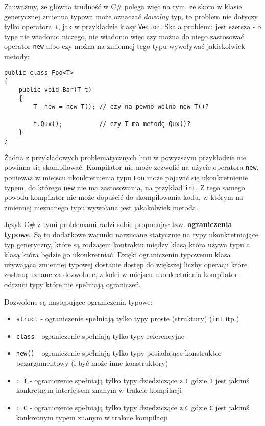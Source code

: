 Zauważmy, że główna trudność w C\# polega więc na tym, że skoro w klasie generycznej zmienna typowa może oznaczać
{\em dowolny} typ, to problem nie dotyczy tylko operatora {\tt +}, jak w przykładzie klasy {\tt Vector}. Skala problemu
jest szersza - o type nie wiadomo niczego, nie wiadomo więc czy można do niego zastosować operator {\tt new} albo czy można
na zmiennej tego typu wywoływać jakiekolwiek metody:

\begin{scriptsize}
\begin{verbatim}
public class Foo<T>
{
    public void Bar(T t)
    {
        T _new = new T(); // czy na pewno wolno new T()?

        t.Qux();          // czy T ma metodę Qux()?
    }
}
\end{verbatim}
\end{scriptsize}

Żadna z przykładowych problematycznych linii w powyższym przykładzie nie powinna się skompilować. 
Kompilator nie może zezwolić na użycie operatora {\tt new}, ponieważ w miejscu ukonkretnienia typu {\tt Foo} może 
pojawić się ukonkretnienie typem, do którego {\tt new} nie ma zastosowania, na przykład {\tt int}. Z tego samego
powodu kompilator nie może dopuścić do skompilowania kodu, w którym na zmiennej nieznanego typu wywołana jest jakakolwiek metoda.

Język C\# z tymi problemami radzi sobie proponując tzw. {\bf ograniczenia typowe}. Są to dodatkowe warunki narzucane
statycznie na typy ukonkretniające typ generyczny, które są rodzajem kontraktu między klasą która używa typu
a klasą która będzie go ukonkretniać. Dzięki ograniczeniu typowemu klasa używająca zmiennej typowej dostanie dostęp
do większej liczby operacji które zostaną uznane za dozwolone, z kolei w miejscu ukonkretnienia kompilator
odrzuci typy które nie spełniają ograniczeń.

Dozwolone są następujące ograniczenia typowe:
\begin{itemize}
\item {\tt struct} - ograniczenie spełniają tylko typy proste (struktury) ({\tt int} itp.)
\item {\tt class} - ograniczenie spełniają tylko typy referencyjne
\item {\tt new()} - ograniczenie spełniają tylko typy posiadające konstruktor bezargumentowy (i być może inne konstruktory)
\item {\tt : I} - ograniczenie spełniają tylko typy dziedziczące z {\tt I} gdzie {\tt I} jest jakimś konkretnym interfejsem znanym w trakcie kompilacji
\item {\tt : C} - ograniczenie spełniają tylko typy dziedziczące z {\tt C} gdzie {\tt C} jest jakimś konkretnym typem znanym w trakcie kompilacji
\end{itemize}

